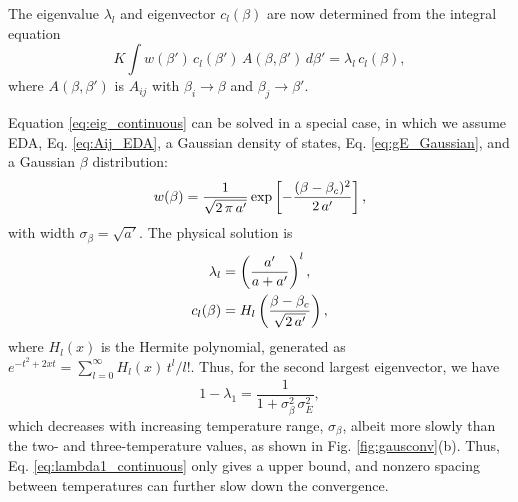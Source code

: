 \documentclass{gMOS2e}
\begin{document}
The eigenvalue $\lambda_l$
and eigenvector $c_l(\beta)$
are now determined from the integral equation
%
\begin{equation}
K \int w(\beta') \, c_l(\beta') \, A(\beta, \beta') \, d\beta'
= \lambda_l \, c_l(\beta),
\label{eq:eig_continuous}
\end{equation}
%
where
$A(\beta, \beta')$
is $A_{ij}$
with $\beta_i \rightarrow \beta$ and $\beta_j \rightarrow \beta'$.



Equation \eqref{eq:eig_continuous}
can be solved in a special case, in which
we assume EDA, Eq. \eqref{eq:Aij_EDA},
a Gaussian density of states,
Eq. \eqref{eq:gE_Gaussian},
and
a Gaussian $\beta$ distribution:
%
\begin{align}
w(\beta)
=
\frac{1}{\sqrt{2 \, \pi \, a'}}
\exp\left[
  -\frac{ (\beta - \beta_c)^2 }{ 2 \, a' }
\right],
\notag
\end{align}
%
with width $\sigma_\beta = \sqrt{a'}$.
%
%
%
The physical solution is
%
\begin{align}
\lambda_l
&=
\left(
  \frac { a' } { a + a' }
\right)^l,
\notag
\\
c_l(\beta)
&=
H_l\left(
  \frac{ \beta - \beta_c }
  { \sqrt{ 2 \, a' } }
\right),
\notag
\end{align}
%
where
$H_l(x)$
is the Hermite polynomial\cite{
arfken, abramowitz, wang_specfunc},
generated as
$e^{-t^2 + 2x t} = \sum_{l = 0}^\infty H_l(x) \, t^l/l!$.
%
Thus, for the second largest eigenvector,
we have
%
\begin{equation}
1 - \lambda_1
=
\frac{1}
{ 1 + \sigma_\beta^2 \, \sigma_E^2},
\label{eq:lambda1_continuous}
\end{equation}
%
which decreases
with increasing temperature range,
$\sigma_\beta$,
albeit more slowly than
the two- and three-temperature values,
as shown in Fig. \ref{fig:gausconv}(b).
%
Thus,
Eq. \eqref{eq:lambda1_continuous}
only gives a upper bound,
and nonzero spacing between temperatures
can further slow down the convergence.




\end{document}
